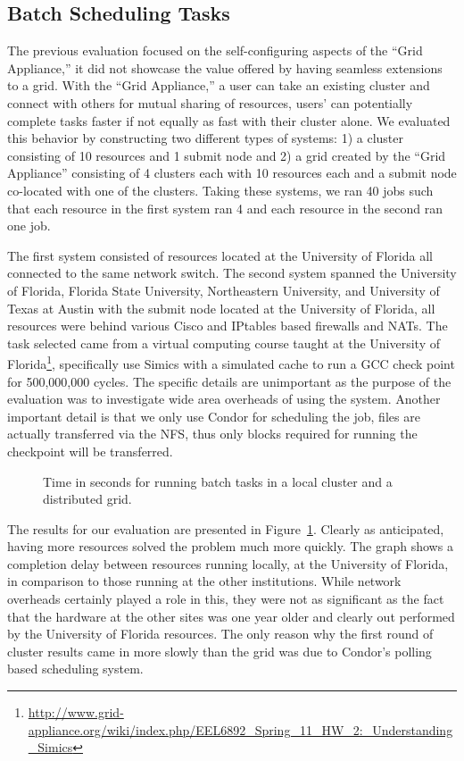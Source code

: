 \documentclass[twocolumn]{svjour3}
\begin{document}
\subsection{Batch Scheduling Tasks}

The previous evaluation focused on the self-configuring aspects of the ``Grid
Appliance,'' it did not showcase the value offered by having seamless
extensions to a grid.  With the ``Grid Appliance,'' a user can take an existing
cluster and connect with others for mutual sharing of resources, users' can
potentially complete tasks faster if not equally as fast with their cluster
alone.  We evaluated this behavior by constructing two different types of
systems: 1) a cluster consisting of 10 resources and 1 submit node and 2) a
grid created by the ``Grid Appliance'' consisting of 4 clusters each with 10
resources each and a submit node co-located with one of the clusters.  Taking
these systems, we ran 40 jobs such that each resource in the first system ran 4
and each resource in the second ran one job.

The first system consisted of resources located at the University of Florida
all connected to the same network switch.  The second system spanned the
University of Florida, Florida State University, Northeastern University, and
University of Texas at Austin with the submit node located at the University of
Florida, all resources were behind various Cisco and IPtables based firewalls
and NATs.  The task selected came from a virtual computing course taught at the
University of
Florida\footnote{\url{http://www.grid-appliance.org/wiki/index.php/EEL6892_Spring_11_HW_2:_Understanding_Simics}},
specifically use Simics with a simulated cache to run a GCC check point for
500,000,000 cycles.  The specific details are unimportant as the purpose of the
evaluation was to investigate wide area overheads of using the system.  Another
important detail is that we only use Condor for scheduling the job, files are
actually transferred via the NFS, thus only blocks required for running the
checkpoint will be transferred.

\begin{figure}[ht]
\centering
{}
\caption{Time in seconds for running batch tasks in a local cluster and a
distributed grid.}
\label{fig:simics}
\end{figure}

The results for our evaluation are presented in Figure~\ref{fig:simics}.
Clearly as anticipated, having more resources solved the problem much more
quickly.  The graph shows a completion delay between resources running locally,
at the University of Florida, in comparison to those running at the other
institutions.  While network overheads certainly played a role in this, they
were not as significant as the fact that the hardware at the other sites was
one year older and clearly out performed by the University of Florida
resources.  The only reason why the first round of cluster results came in more
slowly than the grid was due to Condor's polling based scheduling system.
\end{document}
